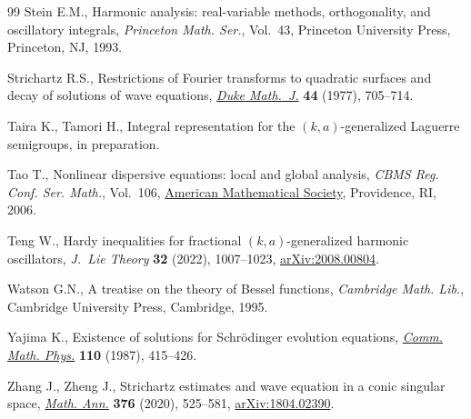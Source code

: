 \documentclass[10pt,a4paper]{amsart}
\numberwithin{equation}{section}
\begin{document}
\begin{thebibliography}{99}
Stein E.M., Harmonic analysis: real-variable methods, orthogonality, and
 oscillatory integrals, \textit{Princeton Math. Ser.}, Vol.~43, Princeton
 University Press, Princeton, NJ, 1993.

Strichartz R.S., Restrictions of {F}ourier transforms to quadratic surfaces and
 decay of solutions of wave equations, \href{https://doi.org/10.1215/S0012-7094-77-04430-1}{\textit{Duke Math.~J.}} \textbf{44}
 (1977), 705--714.

Taira K., Tamori H., Integral representation for the $(k,a)$-generalized {L}aguerre semigroups, {i}n preparation.

Tao T., Nonlinear dispersive equations: local and global analysis, \textit{CBMS
 Reg. Conf. Ser. Math.}, Vol.~106, \href{https://doi.org/10.1090/cbms/106}{American Mathematical Society}, Providence,
 RI, 2006.

Teng W., Hardy inequalities for fractional {$(k,a)$}-generalized harmonic
 oscillators, \textit{J.~Lie Theory} \textbf{32} (2022), 1007--1023,
 \href{https://arxiv.org/abs/2008.00804}{arXiv:2008.00804}.

Watson G.N., A treatise on the theory of {B}essel functions, \textit{Cambridge Math. Lib.}, Cambridge University Press, Cambridge, 1995.

Yajima K., Existence of solutions for {S}chr\"odinger evolution equations,
 \href{https://doi.org/10.1007/BF01212420}{\textit{Comm. Math. Phys.}} \textbf{110} (1987), 415--426.

Zhang J., Zheng J., Strichartz estimates and wave equation in a conic singular
 space, \href{https://doi.org/10.1007/s00208-019-01892-7}{\textit{Math. Ann.}} \textbf{376} (2020), 525--581,
 \href{https://arxiv.org/abs/1804.02390}{arXiv:1804.02390}.

\end{thebibliography}
\end{document}
